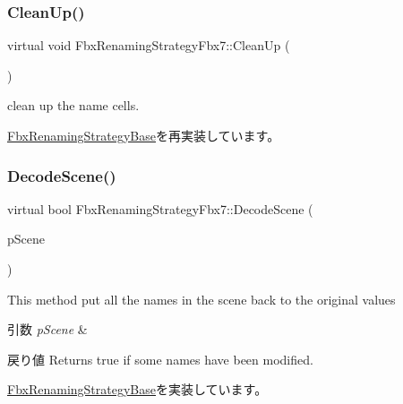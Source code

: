 \subsubsection{\texorpdfstring{Clean\+Up()}{CleanUp()}}
{\footnotesize\ttfamily virtual void Fbx\+Renaming\+Strategy\+Fbx7\+::\+Clean\+Up (\begin{DoxyParamCaption}{ }\end{DoxyParamCaption})\hspace{0.3cm}{\ttfamily [virtual]}}



clean up the name cells. 



\hyperlink{class_fbx_renaming_strategy_base_ae1ab8784f6769fce3068ee21e3c34196}{Fbx\+Renaming\+Strategy\+Base}を再実装しています。

\mbox{\label{class_fbx_renaming_strategy_fbx7_a203a4659e427f4c6046eff93031a24bf}} 
\subsubsection{\texorpdfstring{Decode\+Scene()}{DecodeScene()}}
{\footnotesize\ttfamily virtual bool Fbx\+Renaming\+Strategy\+Fbx7\+::\+Decode\+Scene (\begin{DoxyParamCaption}\item[{\hyperlink{class_fbx_scene}{Fbx\+Scene} $\ast$}]{p\+Scene }\end{DoxyParamCaption})\hspace{0.3cm}{\ttfamily [virtual]}}

This method put all the names in the scene back to the original values 
\begin{DoxyParams}{引数}
{\em p\+Scene} & \\
\hline
\end{DoxyParams}
\begin{DoxyReturn}{戻り値}
Returns true if some names have been modified. 
\end{DoxyReturn}


\hyperlink{class_fbx_renaming_strategy_base_a6c368dff1424b4b54cdfa49ad49bf09c}{Fbx\+Renaming\+Strategy\+Base}を実装しています。

\mbox{\label{class_fbx_renaming_strategy_fbx7_a9f8f8714746bdc9904c31741e0b595f6}} 
